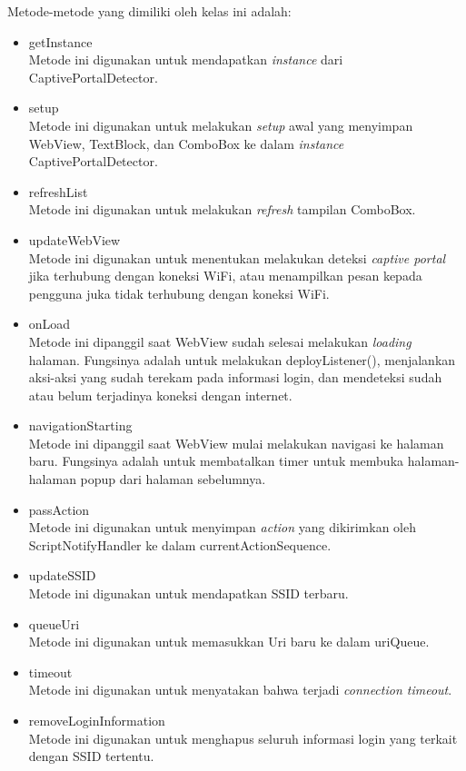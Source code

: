 \documentclass[a4paper,twoside]{article}
\begin{document}
\begin{enumerate}
\begin{itemize}
{                Metode-metode yang dimiliki oleh kelas ini adalah:
                \begin{itemize}
                    \item{getInstance\\Metode ini digunakan untuk mendapatkan \textit{instance} dari CaptivePortalDetector.}
                    \item{setup\\Metode ini digunakan untuk melakukan \textit{setup} awal yang menyimpan WebView, TextBlock, dan ComboBox ke dalam \textit{instance} CaptivePortalDetector.}
                    \item{refreshList\\Metode ini digunakan untuk melakukan \textit{refresh} tampilan ComboBox.}
                    \item{updateWebView\\Metode ini digunakan untuk menentukan melakukan deteksi \textit{captive portal} jika terhubung dengan koneksi WiFi, atau menampilkan pesan kepada pengguna juka tidak terhubung dengan koneksi WiFi.}
                    \item{onLoad\\Metode ini dipanggil saat WebView sudah selesai melakukan \textit{loading} halaman. Fungsinya adalah untuk melakukan deployListener(), menjalankan aksi-aksi yang sudah terekam pada informasi login, dan mendeteksi sudah atau belum terjadinya koneksi dengan internet.}
                    \item{navigationStarting\\Metode ini dipanggil saat WebView mulai melakukan navigasi ke halaman baru. Fungsinya adalah untuk membatalkan timer untuk membuka halaman-halaman popup dari halaman sebelumnya.}
                    \item{passAction\\Metode ini digunakan untuk menyimpan \textit{action} yang dikirimkan oleh ScriptNotifyHandler ke dalam currentActionSequence.}
                    \item{updateSSID\\Metode ini digunakan untuk mendapatkan SSID terbaru.}
                    \item{queueUri\\Metode ini digunakan untuk memasukkan Uri baru ke dalam uriQueue.}
                    \item{timeout\\Metode ini digunakan untuk menyatakan bahwa terjadi \textit{connection timeout}.}
                    \item{removeLoginInformation\\Metode ini digunakan untuk menghapus seluruh informasi login yang terkait dengan SSID tertentu.}
                \end{itemize}
                
}
\end{itemize}
\end{enumerate}
\end{document}

